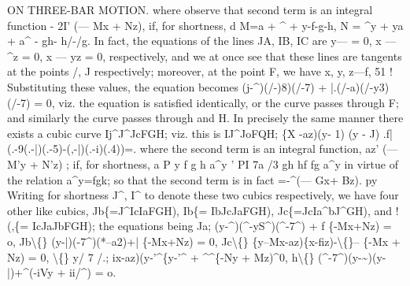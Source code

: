 \documentclass[11pt,a4paper]{book}
\begin{document}
ON THREE-BAR MOTION.
where observe that second term
is an
integral function - 2I' (--- Mx + Nz),
if,
for shortness,
d
M=a + \textasciicircum{} + y-f-g-h,
N = \textasciicircum{}y + ya + a\textasciicircum{} - gh- h/-/g.
In
fact,
the
equations
of
the
lines JA,
IB, IC
are y--- = 0, x --- \textasciicircum{}z = 0, x --- yz = 0,
respectively,
and we
at
once
see
that
these
lines
are
tangents
at
the
points
/, J
respectively;
moreover,
at
the
point
F, we
have
x,
y, z---f, 51
!\textbullet{}
Substituting
these
values, the equation becomes
(j-\textasciicircum{})(/-)8)(/-7) + |.(/-a)(/-y3)(/-7) = 0,
viz.
the
equation
is
satisfied
identically,
or the
curve
passes
through F; and
similarly
the
curve
passes through
and H.
In
precisely
the same manner
there
exists a cubic curve Ij\textasciicircum{}J\textasciicircum{}JcFGH;
viz.
this
is
IJ\textasciicircum{}JoFQH;
\{X -az)(y- 1) (y -
J)
.f|(.-9(.-|)(.-5)-(,-|)(.-i)(.4))=\guillemotright{}.
where the second term
is an integral
function,
az' (--- M'y + N'z)
;
if,
for shortness,
a
P
y
f
g
h
a\textasciicircum{}y
'
PI
7a
\guillemotleft{}/3
gh
hf
fg
a\textasciicircum{}y
in virtue of the
relation a\textasciicircum{}y=fgk;
so that the second term
is in
fact =-\textasciicircum{}(--- Gx+ Bz).
py
Writing
for
shortness
J\textasciicircum{},
I\textasciicircum{}
to
denote
these
two
cubics
respectively,
we
have
four
other
like
cubics, Jb\{=J\textasciicircum{}IcIaFGH), Ib\{= IbJcJaFGH), Jc\{=JcIa\textasciicircum{}bJ\textasciicircum{}GH), and
!(,\{= IcJaJbFGH);
the equations being
Ja;
(y-\textasciicircum{})(\textasciicircum{}-yS\textasciicircum{})(\textasciicircum{}-7\textasciicircum{}) + f \{-Mx+Nz) = o,
Jb\textbackslash\{\}
(y-|)(\guillemotleft{}-7\textasciicircum{})(*--a2)+| \{-Mx+Nz) = 0,
Jc\textbackslash\{\}
\{y--Mx-az)\{x-fiz)-\textbackslash\{\}-- \{-Mx + Nz) = 0,
\textbackslash\{\}
y/
7
/.;
ix-az)(y-'\textasciicircum{}\{y-'\textasciicircum{} + \textasciicircum{}\textasciicircum{}\{-Ny + Mz)\textasciicircum{}0,
h\textbackslash\{\}
(\textasciicircum{}-7\textasciicircum{})(y-\textasciitilde{})(y-|)+\textasciicircum{}(-iVy + ii/\textasciicircum{}) = o.
\end{document}
